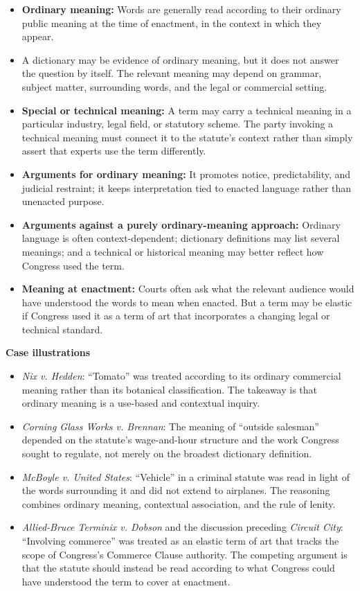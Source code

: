\documentclass[11pt]{tex/lawoutline}
\begin{document}
\begin{itemize}
    \item \textbf{Ordinary meaning:} Words are generally read according to their ordinary public meaning at the time of enactment, in the context in which they appear.
    \item A dictionary may be evidence of ordinary meaning, but it does not answer the question by itself. The relevant meaning may depend on grammar, subject matter, surrounding words, and the legal or commercial setting.
    \item \textbf{Special or technical meaning:} A term may carry a technical meaning in a particular industry, legal field, or statutory scheme. The party invoking a technical meaning must connect it to the statute's context rather than simply assert that experts use the term differently.
    \item \textbf{Arguments for ordinary meaning:} It promotes notice, predictability, and judicial restraint; it keeps interpretation tied to enacted language rather than unenacted purpose.
    \item \textbf{Arguments against a purely ordinary-meaning approach:} Ordinary language is often context-dependent; dictionary definitions may list several meanings; and a technical or historical meaning may better reflect how Congress used the term.
    \item \textbf{Meaning at enactment:} Courts often ask what the relevant audience would have understood the words to mean when enacted. But a term may be elastic if Congress used it as a term of art that incorporates a changing legal or technical standard.
\end{itemize}

\textbf{Case illustrations}

\begin{itemize}
    \item \textit{Nix v. Hedden}: ``Tomato'' was treated according to its ordinary commercial meaning rather than its botanical classification. The takeaway is that ordinary meaning is a use-based and contextual inquiry.
    \item \textit{Corning Glass Works v. Brennan}: The meaning of ``outside salesman'' depended on the statute's wage-and-hour structure and the work Congress sought to regulate, not merely on the broadest dictionary definition.
    \item \textit{McBoyle v. United States}: ``Vehicle'' in a criminal statute was read in light of the words surrounding it and did not extend to airplanes. The reasoning combines ordinary meaning, contextual association, and the rule of lenity.
    \item \textit{Allied-Bruce Terminix v. Dobson} and the discussion preceding \textit{Circuit City}: ``Involving commerce'' was treated as an elastic term of art that tracks the scope of Congress's Commerce Clause authority. The competing argument is that the statute should instead be read according to what Congress could have understood the term to cover at enactment.
\end{itemize}
\end{document}
